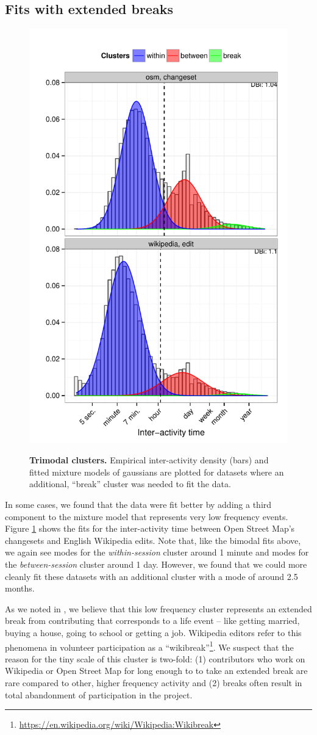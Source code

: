\subsection{Fits with extended breaks}
\begin{figure}
\centering
\includegraphics[width=.45\textwidth]{figures/trimodal_clusters.pdf}
\label{fig:trimodal_clusters}
\caption{
    \textbf{Trimodal clusters.} Empirical inter-activity density (bars) and fitted mixture models of gaussians are plotted for datasets where an additional, ``break'' cluster was needed to fit the data.
}
\end{figure}
In some cases, we found that the data were fit better by adding a third component to the mixture model that represents very low frequency events.  Figure \ref{fig:trimodal_clusters} shows the fits for the inter-activity time between Open Street Map's changesets and English Wikipedia edits.  Note that, like the bimodal fits above, we again see modes for the \emph{within-session} cluster around 1 minute and modes for the \emph{between-session} cluster around 1 day.  However, we found that we could more cleanly fit these datasets with an additional cluster with a mode of around 2.5 months.

As we noted in \cite{geiger2013using}, we believe that this low frequency cluster represents an extended break from contributing that corresponds to a life event -- like getting married, buying a house, going to school or getting a job.  Wikipedia editors refer to this phenomena in volunteer participation as a ``wikibreak''\footnote{\url{https://en.wikipedia.org/wiki/Wikipedia:Wikibreak}}.  We suspect that the reason for the tiny scale of this cluster is two-fold: (1) contributors who work on Wikipedia or Open Street Map for long enough to to take an extended break are rare compared to other, higher frequency activity and (2) breaks often result in total abandonment of participation in the project.

